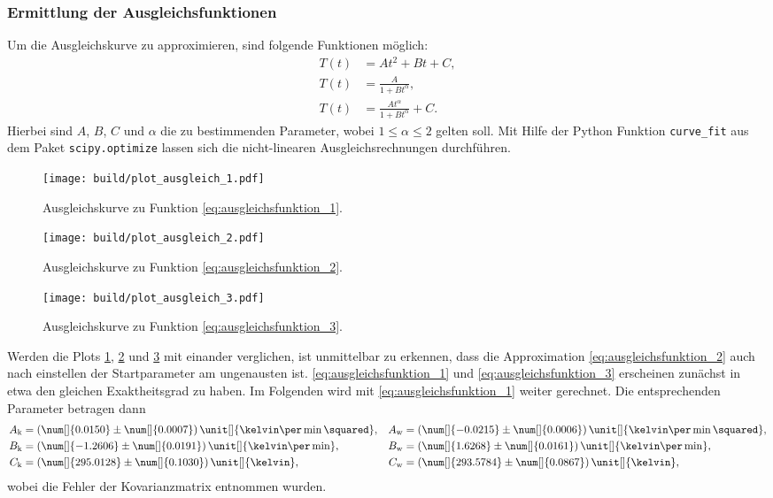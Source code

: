 \subsubsection{Ermittlung der Ausgleichsfunktionen}
Um die Ausgleichskurve zu approximieren, sind folgende Funktionen möglich:
\begin{align}
    T \left(t\right) &= A t^2 + B t + C \label{eq:ausgleichsfunktion_1}, \\
    T \left(t\right) &= \frac{A}{1 + B t^{\alpha}} \label{eq:ausgleichsfunktion_2}, \\
    T \left(t\right) &= \frac{A t^{\alpha}}{1 + B t^{\alpha}} + C \label{eq:ausgleichsfunktion_3}.
\end{align}
Hierbei sind $A$, $B$, $C$ und $\alpha$ die zu bestimmenden Parameter, wobei $1 \leq \alpha \leq 2$ gelten soll.
Mit Hilfe der Python \cite[]{python} Funktion \texttt{curve\_fit} aus dem Paket \texttt{scipy.optimize} 
\cite[]{scipy} lassen sich die nicht-linearen Ausgleichsrechnungen durchführen.
\begin{figure}[H]
    \texttt{[image: build/plot\_ausgleich\_1.pdf]}
    \caption[]{Ausgleichskurve zu Funktion \eqref{eq:ausgleichsfunktion_1}.}
    \label{fig:ausgleichsplot_1}
\end{figure}
\begin{figure}[H]
    \texttt{[image: build/plot\_ausgleich\_2.pdf]}
    \caption[]{Ausgleichskurve zu Funktion \eqref{eq:ausgleichsfunktion_2}.}
    \label{fig:ausgleichsplot_2}
\end{figure}
\begin{figure}[H]
    \texttt{[image: build/plot\_ausgleich\_3.pdf]}
    \caption[]{Ausgleichskurve zu Funktion \eqref{eq:ausgleichsfunktion_3}.}
    \label{fig:ausgleichsplot_3}
\end{figure}
\noindent
Werden die Plots \ref{fig:ausgleichsplot_1}, \ref{fig:ausgleichsplot_2} und \ref{fig:ausgleichsplot_3} mit einander verglichen,
ist unmittelbar zu erkennen, dass die Approximation \eqref{eq:ausgleichsfunktion_2} auch nach einstellen der Startparameter am ungenausten ist.
\eqref{eq:ausgleichsfunktion_1} und \eqref{eq:ausgleichsfunktion_3} erscheinen zunächst in etwa den gleichen Exaktheitsgrad zu haben.
Im Folgenden wird mit \eqref{eq:ausgleichsfunktion_1} weiter gerechnet.
Die entsprechenden Parameter betragen dann
\begin{align*}
    A_{\text{k}} &= \left(\num[]{  0.0150} \pm \num[]{0.0007}\right) \unit[]{\kelvin\per\min\squared}, & 
    A_{\text{w}} &= \left(\num[]{ -0.0215} \pm \num[]{0.0006}\right) \unit[]{\kelvin\per\min\squared}, \\
    B_{\text{k}} &= \left(\num[]{ -1.2606} \pm \num[]{0.0191}\right) \unit[]{\kelvin\per\min}, &  
    B_{\text{w}} &= \left(\num[]{  1.6268} \pm \num[]{0.0161}\right) \unit[]{\kelvin\per\min}, \\             
    C_{\text{k}} &= \left(\num[]{295.0128} \pm \num[]{0.1030}\right) \unit[]{\kelvin}, &                  
    C_{\text{w}} &= \left(\num[]{293.5784} \pm \num[]{0.0867}\right) \unit[]{\kelvin},                  
\end{align*}
wobei die Fehler der Kovarianzmatrix entnommen wurden.

